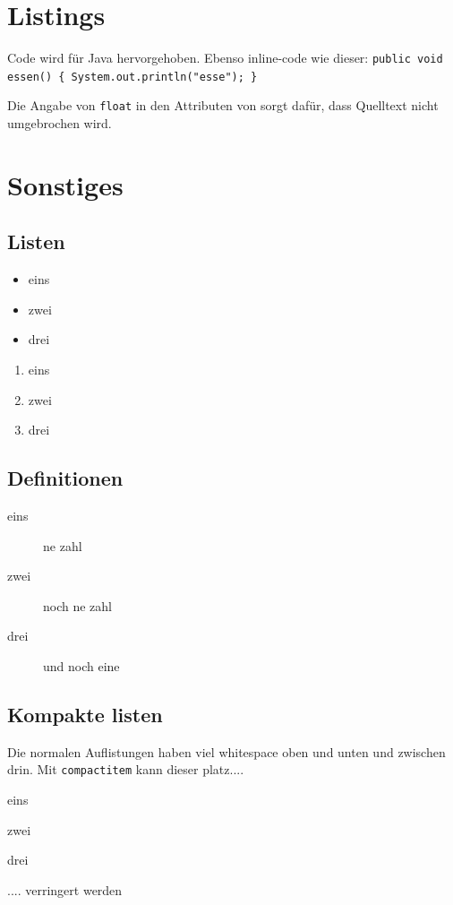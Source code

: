 \section{Listings}

Code wird für Java hervorgehoben. Ebenso inline-code wie dieser: \lstinline|public void essen() { System.out.println("esse"); }|






Die Angabe von \lstinline|float| in den Attributen von \lstinline|| sorgt dafür, dass Quelltext nicht umgebrochen wird. 


\section{Sonstiges}
\subsection{Listen}
\begin{itemize}
\item eins
\item zwei
\item drei
\end{itemize}

\begin{enumerate}
\item eins
\item zwei
\item drei
\end{enumerate}

\subsection{Definitionen}
\begin{description}
\item[eins] ne zahl
\item[zwei] noch ne zahl
\item[drei] und noch eine
\end{description}

\subsection{Kompakte listen}
Die normalen Auflistungen haben viel whitespace oben und unten und zwischen drin. Mit \texttt{compactitem} kann dieser platz....
\begin{compactitem}
\item eins
\item zwei
\item drei
\end{compactitem}
.... verringert werden

